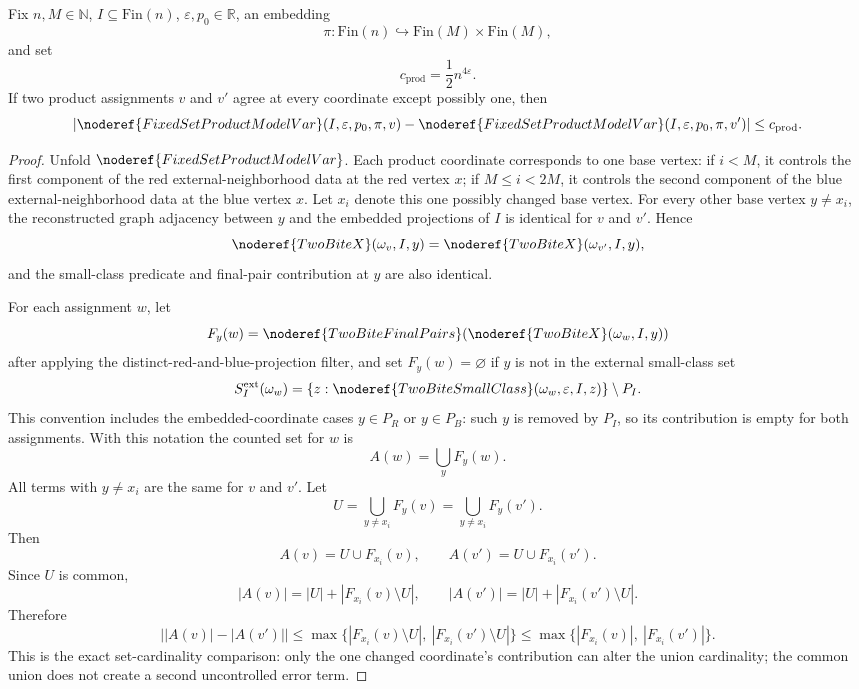 \begin{helper}
Fix \(n,M\in\mathbb N\), \(I\subseteq\mathrm{Fin}(n)\),
\(\varepsilon,p_0\in\mathbb R\), an embedding
\[
\pi:\mathrm{Fin}(n)\hookrightarrow\mathrm{Fin}(M)\times\mathrm{Fin}(M),
\]
and set
\[
c_{\mathrm{prod}}=\frac12 n^{4\varepsilon}.
\]
If two product assignments \(v\) and \(v'\) agree at every coordinate except
possibly one, then
\[
\left|
\noderef{FixedSetProductModelVar}(I,\varepsilon,p_0,\pi,v)
-
\noderef{FixedSetProductModelVar}(I,\varepsilon,p_0,\pi,v')
\right|
\le c_{\mathrm{prod}}.
\]
\end{helper}
\begin{proof}
Unfold \(\noderef{FixedSetProductModelVar}\).  Each product coordinate
corresponds to one base vertex: if \(i<M\), it controls the first component of
the red external-neighborhood data at the red vertex \(x\); if \(M\le i<2M\),
it controls the second component of the blue external-neighborhood data at the
blue vertex \(x\).  Let \(x_i\) denote this one possibly changed base vertex.
For every other base vertex \(y\ne x_i\), the reconstructed graph adjacency
between \(y\) and the embedded projections of \(I\) is identical for \(v\) and
\(v'\).  Hence
\[
\noderef{TwoBiteX}(\omega_v,I,y)
=\noderef{TwoBiteX}(\omega_{v'},I,y),
\]
and the small-class predicate and final-pair contribution at \(y\) are also
identical.

For each assignment \(w\), let
\[
F_y(w)=
\noderef{TwoBiteFinalPairs}(\noderef{TwoBiteX}(\omega_w,I,y))
\]
after applying the distinct-red-and-blue-projection filter, and set
\(F_y(w)=\varnothing\) if \(y\) is not in the external small-class set
\[
S_I^{\mathrm{ext}}(\omega_w)
=\{z:\noderef{TwoBiteSmallClass}(\omega_w,\varepsilon,I,z)\}\setminus P_I.
\]
This convention includes the embedded-coordinate cases \(y\in P_R\) or
\(y\in P_B\): such \(y\) is removed by \(P_I\), so its contribution is empty
for both assignments.  With this notation the counted set for \(w\) is
\[
A(w)=\bigcup_y F_y(w).
\]
All terms with \(y\ne x_i\) are the same for \(v\) and \(v'\).  Let
\[
U=\bigcup_{y\ne x_i}F_y(v)=\bigcup_{y\ne x_i}F_y(v').
\]
Then
\[
A(v)=U\cup F_{x_i}(v),\qquad
A(v')=U\cup F_{x_i}(v').
\]
Since \(U\) is common,
\[
|A(v)|=|U|+|F_{x_i}(v)\setminus U|,\qquad
|A(v')|=|U|+|F_{x_i}(v')\setminus U|.
\]
Therefore
\[
\bigl||A(v)|-|A(v')|\bigr|
\le
\max\{|F_{x_i}(v)\setminus U|,\ |F_{x_i}(v')\setminus U|\}
\le
\max\{|F_{x_i}(v)|,\ |F_{x_i}(v')|\}.
\]
This is the exact set-cardinality comparison: only the one changed
coordinate's contribution can alter the union cardinality; the common union
does not create a second uncontrolled error term.


\end{proof}
